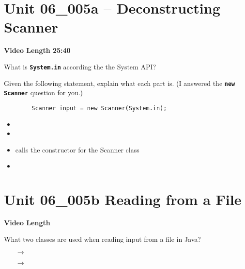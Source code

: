 \documentclass[letterpaper,12pt]{exam}
\newcommand{\unit}{Unit 06}
\begin{document}
\section*{\unit\_005a -- Deconstructing Scanner} %
\par{\selectfont\textbf{Video Length 25:40}}

\begin{questions}
\begin{samepage}
    \question What is \texttt{\textbf{System.in}} according the the System API?
    \vspace{5mm}
\end{samepage}

\begin{samepage}
    \question Given the following statement, explain what each part is.  (I answered the \texttt{\textbf{new Scanner}} question for you.)
    \begin{verbatim}
        Scanner input = new Scanner(System.in);
    \end{verbatim}
    \begin{itemize}
        \item {} 
        \vspace{5mm}
        \item {}
        \vspace{5mm}
        \item {} {\LARGE\color{Blue}\selectfont calls the constructor for the Scanner class}
        \vspace{5mm}
        \item {}
        \vspace{5mm}
       \end{itemize}
\end{samepage}

\section*{\unit\_005b Reading from a File} %
\noindent \textbf{Video Length }

\begin{samepage}
    \question What two classes are used when reading input from a file in Java?
      \begin{itemize}
        \item [$\rightarrow$]
        \vspace{5mm}
        \item [$\rightarrow$]
       \end{itemize}
\end{samepage}


\end{questions}
\end{document}
